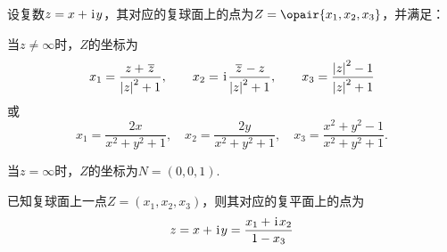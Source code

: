 \begin{theorem}
设复数\(z=x+\kern1pt\mathrm{i}\kern1pt y\)，其对应的复球面上的点为\(Z=\opair{x_1,x_2,x_3}\)，并满足：

当\(z \neq \infty\)时，\(Z\)的坐标为\[
x_1 = \frac{z + \kern1pt\overline{z}\kern1pt}{\abs{z}^2 + 1}, \qquad
x_2 = \kern1pt\mathrm{i}\kern1pt\frac{\kern1pt\overline{z}\kern1pt - z}{\abs{z}^2 + 1}, \qquad
x_3 = \frac{\abs{z}^2 - 1}{\abs{z}^2 + 1}
\]或\[
x_1 = \frac{2x}{x^2+y^2+1}, \quad
x_2 = \frac{2y}{x^2+y^2+1}, \quad
x_3 = \frac{x^2+y^2-1}{x^2+y^2+1}.
\]

当\(z = \infty\)时，\(Z\)的坐标为\(N = (0,0,1)\).
\end{theorem}

\begin{theorem}
已知复球面上一点\(Z=(x_1,x_2,x_3)\)，则其对应的复平面上的点为\[
z = x+\kern1pt\mathrm{i}\kern1pt y = \frac{x_1+\kern1pt\mathrm{i}\kern1pt x_2}{1-x_3}
\]
\end{theorem}
